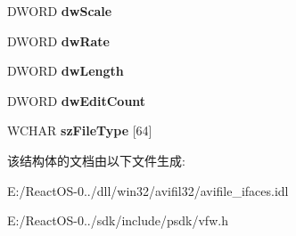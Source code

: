 \begin{DoxyCompactItemize}
D\+W\+O\+RD {\bfseries dw\+Scale}
\item 
\mbox{\label{struct___a_v_i_f_i_l_e_i_n_f_o_w_a0bc65f1547036afacfa22eeb9983847b}} 
D\+W\+O\+RD {\bfseries dw\+Rate}
\item 
\mbox{\label{struct___a_v_i_f_i_l_e_i_n_f_o_w_af5ceb0fbbe3bcb2d7195f3ce162de5af}} 
D\+W\+O\+RD {\bfseries dw\+Length}
\item 
\mbox{\label{struct___a_v_i_f_i_l_e_i_n_f_o_w_ac952aa80e994ff126077baee989c5baa}} 
D\+W\+O\+RD {\bfseries dw\+Edit\+Count}
\item 
\mbox{\label{struct___a_v_i_f_i_l_e_i_n_f_o_w_a529c83786e27f53108e8f5ac94a9e055}} 
W\+C\+H\+AR {\bfseries sz\+File\+Type} \mbox{[}64\mbox{]}
\end{DoxyCompactItemize}


该结构体的文档由以下文件生成\+:\begin{DoxyCompactItemize}
\item 
E\+:/\+React\+O\+S-\/0../dll/win32/avifil32/avifile\+\_\+ifaces.\+idl\item 
E\+:/\+React\+O\+S-\/0../sdk/include/psdk/vfw.\+h\end{DoxyCompactItemize}
